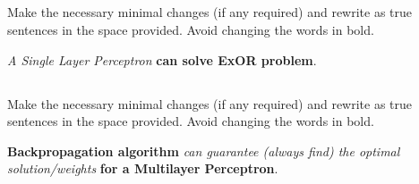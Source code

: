 \begin{frame}
\section{}
Make the necessary minimal changes  (if any required) and rewrite as true sentences in the space provided. Avoid changing the words in bold.

{\em A Single Layer Perceptron} {\bf can solve ExOR problem}.
\end{frame}

\begin{frame}
\section{}
Make the necessary minimal changes  (if any required) and rewrite as true sentences in the space provided. Avoid changing the words in bold.

{\bf Backpropagation algorithm} {\em can guarantee (always find) the optimal solution/weights} {\bf for a Multilayer Perceptron}.
\end{frame}
